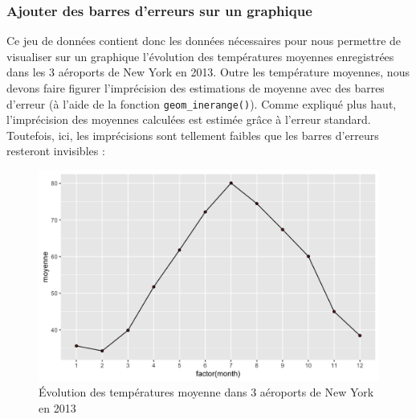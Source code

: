 \documentclass[a4paperpaper,]{article}
\newenvironment{Shaded}{\begin{snugshade}}{\end{snugshade}}
\newcommand{\DataTypeTok}[1]{\textcolor[rgb]{0.00,0.34,0.68}{#1}}
\newcommand{\DecValTok}[1]{\textcolor[rgb]{0.69,0.50,0.00}{#1}}
\newcommand{\KeywordTok}[1]{\textcolor[rgb]{0.12,0.11,0.11}{\textbf{#1}}}
\newcommand{\NormalTok}[1]{\textcolor[rgb]{0.12,0.11,0.11}{#1}}
\newcommand{\OperatorTok}[1]{\textcolor[rgb]{0.12,0.11,0.11}{#1}}
\newcommand{\StringTok}[1]{\textcolor[rgb]{0.75,0.01,0.01}{#1}}
\begin{document}
\hypertarget{ajouter-des-barres-derreurs-sur-un-graphique}{%
\subsubsection{Ajouter des barres d'erreurs sur un graphique}\label{ajouter-des-barres-derreurs-sur-un-graphique}}

Ce jeu de données contient donc les données nécessaires pour nous permettre de visualiser sur un graphique l'évolution des températures moyennes enregistrées dans les 3 aéroports de New York en 2013. Outre les température moyennes, nous devons faire figurer l'imprécision des estimations de moyenne avec des barres d'erreur (à l'aide de la fonction \texttt{geom\_inerange()}). Comme expliqué plus haut, l'imprécision des moyennes calculées est estimée grâce à l'erreur standard. Toutefois, ici, les imprécisions sont tellement faibles que les barres d'erreurs resteront invisibles :

\begin{Shaded}
\end{Shaded}

\begin{figure}[htpb]

{\centering \includegraphics[width=0.9\linewidth]{figure/errorbars-1} 

}

\caption{Évolution des températures moyenne dans 3 aéroports de New York en 2013}\label{fig:errorbars}
\end{figure}
\end{document}
